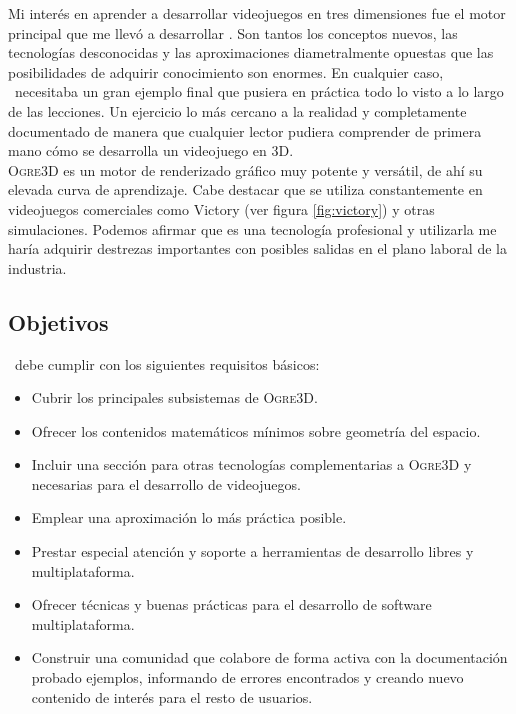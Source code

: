 \documentclass[a4paper,11pt]{article}
\begin{document}
\noindent Mi interés en aprender a desarrollar videojuegos en tres dimensiones fue el
motor principal que me llevó a desarrollar \juego. Son tantos los conceptos
nuevos, las tecnologías desconocidas y las aproximaciones diametralmente
opuestas que las posibilidades de adquirir conocimiento son enormes. En cualquier
caso, \wiki\ necesitaba un gran ejemplo final que pusiera en práctica todo
lo visto a lo largo de las lecciones. Un ejercicio lo más cercano
a la realidad y completamente documentado de manera que cualquier lector pudiera
comprender de primera mano cómo se desarrolla un videojuego en 3D.\\

\noindent \textsc{Ogre3D} es un motor de renderizado gráfico muy potente
y versátil, de ahí su elevada curva de aprendizaje. Cabe destacar que se utiliza
constantemente en videojuegos comerciales como Victory (ver figura
\ref{fig:victory}) y otras simulaciones. Podemos afirmar que es una
tecnología profesional y utilizarla me haría adquirir destrezas importantes
con posibles salidas en el plano laboral de la industria.\\


\subsection{Objetivos}

\noindent \wiki\ debe cumplir con los siguientes requisitos básicos:

\begin{itemize}
    \item Cubrir los principales subsistemas de \textsc{Ogre3D}.
    \item Ofrecer los contenidos matemáticos mínimos sobre geometría del
    espacio.
    \item Incluir una sección para otras tecnologías complementarias a \textsc{Ogre3D}
    y necesarias para el desarrollo de videojuegos.
    \item Emplear una aproximación lo más práctica posible.
    \item Prestar especial atención y soporte a herramientas de desarrollo
    libres y multiplataforma.
    \item Ofrecer técnicas y buenas prácticas para el desarrollo de software
    multiplataforma.
    \item Construir una comunidad que colabore de forma activa con la
    documentación probado ejemplos, informando de errores encontrados y
    creando nuevo contenido de interés para el resto de usuarios.
\end{itemize}
\end{document}
